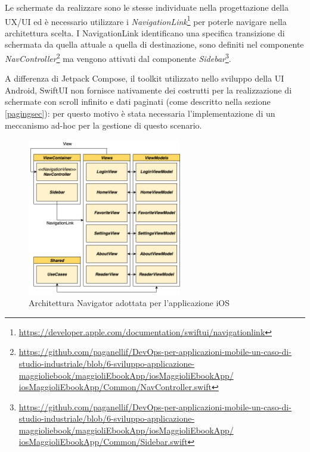Le schermate da realizzare sono le stesse individuate nella progettazione della UX/UI ed è necessario utilizzare i \textit{NavigationLink}\footnote{\href{https://developer.apple.com/documentation/swiftui/navigationlink}{https://developer.apple.com/documentation/swiftui/navigationlink}} per poterle navigare nella architettura scelta. I NavigationLink identificano una specifica transizione di schermata da quella attuale a quella di destinazione, sono definiti nel componente \textit{NavController}\footnote{\href{https://github.com/paganellif/DevOps-per-applicazioni-mobile-un-caso-di-studio-industriale/blob/6-sviluppo-applicazione-maggioliebook/maggioliEbookApp/iosMaggioliEbookApp/iosMaggioliEbookApp/Common/NavController.swift}{https://github.com/paganellif/DevOps-per-applicazioni-mobile-un-caso-di-studio-industriale/blob/6-sviluppo-applicazione-maggioliebook/maggioliEbookApp/iosMaggioliEbookApp/\\iosMaggioliEbookApp/Common/NavController.swift}} ma vengono attivati dal componente \textit{Sidebar}\footnote{\href{https://github.com/paganellif/DevOps-per-applicazioni-mobile-un-caso-di-studio-industriale/blob/6-sviluppo-applicazione-maggioliebook/maggioliEbookApp/iosMaggioliEbookApp/iosMaggioliEbookApp/Common/Sidebar.swift}{https://github.com/paganellif/DevOps-per-applicazioni-mobile-un-caso-di-studio-industriale/blob/6-sviluppo-applicazione-maggioliebook/maggioliEbookApp/iosMaggioliEbookApp/\\iosMaggioliEbookApp/Common/Sidebar.swift}}.

A differenza di Jetpack Compose, il toolkit utilizzato nello sviluppo della UI Android, SwiftUI non fornisce nativamente dei costrutti per la realizzazione di schermate con scroll infinito e dati paginati (come descritto nella sezione \ref{pagingsec}): per questo motivo è stata necessaria l'implementazione di un meccanismo ad-hoc per la gestione di questo scenario.

\begin{figure}[H]
\centering
    \includegraphics[width=0.6\textwidth]{img/navigator-arch-ios.png}
    \caption{Architettura Navigator adottata per l'applicazione iOS}
    \label{iosarchapp}
\end{figure}

